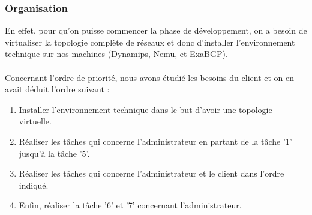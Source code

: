 \subsubsection{Organisation}
En effet, pour qu'on puisse commencer la phase de développement, on a besoin de virtualiser la topologie complète de réseaux et donc d'installer l'environnement technique sur nos machines (Dynamips, Nemu, et ExaBGP).
\\
\\
Concernant l'ordre de priorité, nous avons étudié les besoins du client et on en avait déduit l'ordre suivant : 
\begin{enumerate}
\item Installer l'environnement technique dans le but d'avoir une topologie virtuelle.
\item Réaliser les tâches qui concerne l'administrateur en partant de la tâche '1' jusqu'à la tâche '5'.
\item Réaliser les tâches qui concerne l'administrateur et le client dans l'ordre indiqué.
\item Enfin, réaliser la tâche '6' et '7' concernant l'administrateur.
\end{enumerate}
